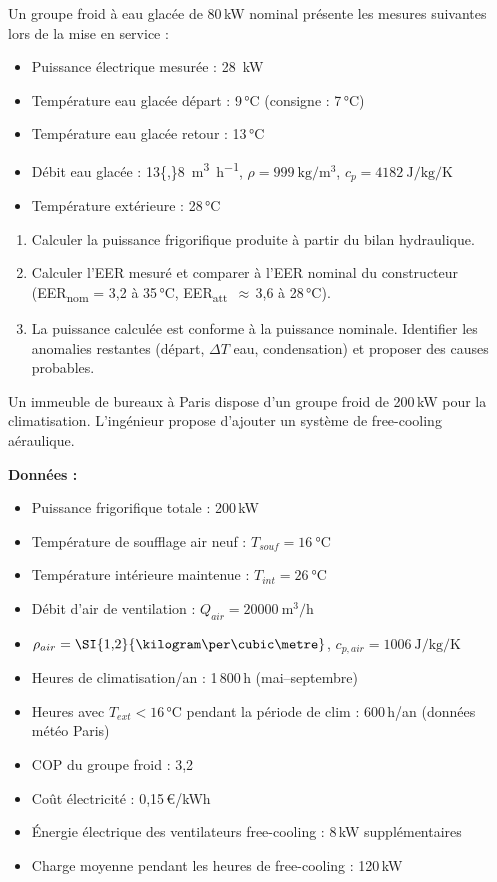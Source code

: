 
Un groupe froid à eau glacée de 80\,kW nominal présente les mesures suivantes lors de la mise en service :
\begin{itemize}
  \item Puissance électrique mesurée : \SI{28}{\kilo\watt}
  \item Température eau glacée départ : 9\,°C (consigne : 7\,°C)
  \item Température eau glacée retour : 13\,°C
  \item Débit eau glacée : \SI{13{,}8}{\cubic\metre\per\hour}, $\rho = \SI{999}{\kilogram\per\cubic\metre}$, $c_p = \SI{4182}{\joule\per\kilogram\per\kelvin}$
  \item Température extérieure : 28\,°C
\end{itemize}

\begin{enumerate}
  \item Calculer la puissance frigorifique produite à partir du bilan hydraulique.
  \item Calculer l'EER mesuré et comparer à l'EER nominal du constructeur (EER\textsubscript{nom} = 3,2 à 35\,°C, EER\textsubscript{att} \,$\approx$\,3,6 à 28\,°C).
  \item La puissance calculée est conforme à la puissance nominale. Identifier les anomalies restantes (départ, $\Delta T$ eau, condensation) et proposer des causes probables.
\end{enumerate}


Un immeuble de bureaux à Paris dispose d'un groupe froid de 200\,kW pour la climatisation. L'ingénieur propose d'ajouter un système de free-cooling aéraulique.

\textbf{Données :}
\begin{itemize}
  \item Puissance frigorifique totale : 200\,kW
  \item Température de soufflage air neuf : $T_{souf} = \SI{16}{\degreeCelsius}$
  \item Température intérieure maintenue : $T_{int} = \SI{26}{\degreeCelsius}$
  \item Débit d'air de ventilation : $Q_{air} = \SI{20000}{\cubic\metre\per\hour}$
  \item $\rho_{air} = \SI{1{,}2}{\kilogram\per\cubic\metre}$, $c_{p,air} = \SI{1006}{\joule\per\kilogram\per\kelvin}$
  \item Heures de climatisation/an : 1\,800\,h (mai–septembre)
  \item Heures avec $T_{ext} < 16$\,°C pendant la période de clim : 600\,h/an (données météo Paris)
  \item COP du groupe froid : 3,2
  \item Coût électricité : 0,15\,€/kWh
  \item Énergie électrique des ventilateurs free-cooling : 8\,kW supplémentaires
  \item Charge moyenne pendant les heures de free-cooling : 120\,kW
\end{itemize}

